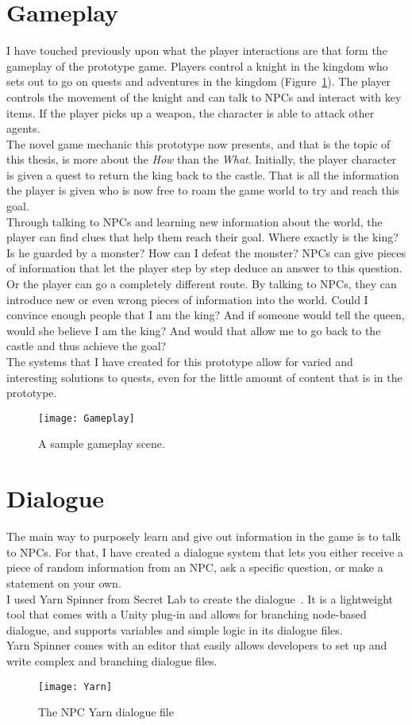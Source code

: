 \section{Gameplay}
I have touched previously upon what the player interactions are that form the gameplay of the prototype game. Players control a knight in the kingdom who sets out to go on quests and adventures in the kingdom (Figure~\ref{fig:gameplay}). The player controls the movement of the knight and can talk to NPCs and interact with key items. If the player picks up a weapon, the character is able to attack other agents.\\
The novel game mechanic this prototype now presents, and that is the topic of this thesis, is more about the \textit{How} than the \textit{What}. Initially, the player character is given a quest to return the king back to the castle. That is all the information the player is given who is now free to roam the game world to try and reach this goal.\\
Through talking to NPCs and learning new information about the world, the player can find clues that help them reach their goal. Where exactly is the king? Is he guarded by a monster? How can I defeat the monster? NPCs can give pieces of information that let the player step by step deduce an answer to this question.\\
Or the player can go a completely different route. By talking to NPCs, they can introduce new or even wrong pieces of information into the world. Could I convince enough people that I am the king? And if someone would tell the queen, would she believe I am the king? And would that allow me to go back to the castle and thus achieve the goal?\\
The systems that I have created for this prototype allow for varied and interesting solutions to quests, even for the little amount of content that is in the prototype.
\begin{figure}
	\centering
	\texttt{[image: Gameplay]}
	\caption{A sample gameplay scene.}
	\label{fig:gameplay}
\end{figure}
\section{Dialogue}
The main way to purposely learn and give out information in the game is to talk to NPCs. For that, I have created a dialogue system that lets you either receive a piece of random information from an NPC, ask a specific question, or make a  statement on your own.\\
I used Yarn Spinner from Secret Lab to create the dialogue~\cite{Secret2021}. It is a lightweight tool that comes with a Unity plug-in and allows for branching node-based dialogue, and supports variables and simple logic in its dialogue files.\\
Yarn Spinner comes with an editor that easily allows developers to set up and write complex and branching dialogue files.
\begin{figure}
	\centering
	\texttt{[image: Yarn]}
	\caption{The NPC Yarn dialogue file}
	\label{fig:yarn}
\end{figure}
